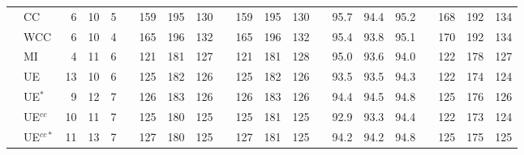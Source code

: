\documentclass[
  12pt,
  openany, oneside]{book}
\theoremstyle{definition}
\theoremstyle{definition}
\theoremstyle{definition}
\theoremstyle{definition}
\theoremstyle{remark}
\begin{document}
\begin{table}
\begin{tabular}{rlrrrrrrrrrrrrrrrrrrr}
& CC      & 6 & 10 &    5 &&    159 &  195 &  130 &&  159  &  195 &   130 &&   95.7 &  94.4 &  95.2 &&  168 &  192 &  134 \\
& WCC    & 6 & 10 &    4 &&   165  & 196  & 132 &&  165  &  196   & 132  &&  95.4 &  93.8  & 95.1 &&  170  & 192  & 134 \\
& MI     & 4 & 11 &   6 &&    121 &  181  & 127  && 121  &  181   & 128   && 95.0 &   93.6 &  94.0  &&   122 &  178 &  127 \\
& UE     & 13 & 10 &   6 &&    125  & 182  & 126  && 125  &  182   & 126   && 93.5 &  93.5 &  94.3  && 122  & 174  & 124 \\
& UE$^*$ & 9 & 12 &    7 &&     126 &  183 &  126 &&  126 &   183  &  126  &&  94.4 &  94.5 &  94.8 &&  125  & 176 &  126 \\
& UE$^{cc}$ & 10 &  11 &   7 &&    125  & 180  & 125 &&  125  &  181  &  125   && 92.9 &  93.3 &  94.4  && 122  & 173 &  124 \\
& UE$^{cc*}$ &  11 &  13 &   7 &&    127  & 180  & 125  && 127  &  181   & 125   && 94.2  & 94.2  & 94.8  && 125  & 175 &  125 \\


\end{tabular}
\end{table}
\end{document}
